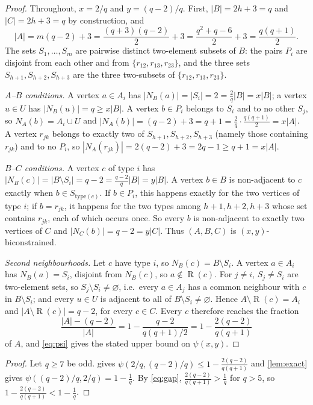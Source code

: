 \documentclass[11pt,a4paper]{article}
\theoremstyle{plain}
\theoremstyle{definition}
\theoremstyle{remark}
\newcommand{\NB}{N_B}
\newcommand{\NA}{N_A}
\newcommand{\NC}{N_C}
\DeclareMathOperator{\reach}{R}
\begin{document}
\label{pf:upper}
\propupper*
\begin{proof}
Throughout, $x=2/q$ and $y=(q-2)/q$. First, $|B|=2h+3=q$ and $|C|=2h+3=q$ by construction, and
\[
 |A|=m(q-2)+3=\frac{(q+3)(q-2)}2+3=\frac{q^2+q-6}2+3=\frac{q(q+1)}2 .
\]
The sets $S_1,\dots,S_m$ are pairwise distinct two-element subsets of $B$: the pairs $P_i$ are disjoint from each other and from $\{r_{12},r_{13},r_{23}\}$, and the three sets $S_{h+1},S_{h+2},S_{h+3}$ are the three two-subsets of $\{r_{12},r_{13},r_{23}\}$.

\emph{$A$--$B$ conditions.} A vertex $a\in A_i$ has $|\NB(a)|=|S_i|=2=\frac2q|B|=x|B|$; a vertex $u\in U$ has $|\NB(u)|=q\ge x|B|$. A vertex $b\in P_i$ belongs to $S_i$ and to no other $S_j$, so $\NA(b)=A_i\cup U$ and $|\NA(b)|=(q-2)+3=q+1=\frac2q\cdot\frac{q(q+1)}2=x|A|$. A vertex $r_{jk}$ belongs to exactly two of $S_{h+1},S_{h+2},S_{h+3}$ (namely those containing $r_{jk}$) and to no $P_i$, so $|\NA(r_{jk})|=2(q-2)+3=2q-1\ge q+1=x|A|$.

\emph{$B$--$C$ conditions.} A vertex $c$ of type $i$ has $|\NB(c)|=|B\setminus S_i|=q-2=\frac{q-2}q|B|=y|B|$. A vertex $b\in B$ is non-adjacent to $c$ exactly when $b\in S_{\text{type}(c)}$. If $b\in P_i$, this happens exactly for the two vertices of type $i$; if $b=r_{jk}$, it happens for the two types among $h+1,h+2,h+3$ whose set contains $r_{jk}$, each of which occurs once. So every $b$ is non-adjacent to exactly two vertices of $C$ and $|\NC(b)|=q-2=y|C|$. Thus $(A,B,C)$ is $(x,y)$-biconstrained.

\emph{Second neighbourhoods.} Let $c$ have type $i$, so $\NB(c)=B\setminus S_i$. A vertex $a\in A_i$ has $\NB(a)=S_i$, disjoint from $\NB(c)$, so $a\notin\reach(c)$. For $j\ne i$, $S_j\ne S_i$ are two-element sets, so $S_j\setminus S_i\ne\varnothing$, i.e.\ every $a\in A_j$ has a common neighbour with $c$ in $B\setminus S_i$; and every $u\in U$ is adjacent to all of $B\setminus S_i\ne\varnothing$. Hence $A\setminus\reach(c)=A_i$ and $|A\setminus\reach(c)|=q-2$, for every $c\in C$. Every $c$ therefore reaches the fraction
\[
 \frac{|A|-(q-2)}{|A|}=1-\frac{q-2}{q(q+1)/2}=1-\frac{2(q-2)}{q(q+1)}
\]
of $A$, and \eqref{eq:psi} gives the stated upper bound on $\psi(x,y)$.
\end{proof}

\label{pf:main}
\thmmain*
\begin{proof}
Let $q\ge7$ be odd.  gives $\psi(2/q,(q-2)/q)\le1-\frac{2(q-2)}{q(q+1)}$ and \cref{lem:exact} gives $\psi((q-2)/q,2/q)=1-\frac1q$. By \eqref{eq:gap}, $\frac{2(q-2)}{q(q+1)}>\frac1q$ for $q>5$, so $1-\frac{2(q-2)}{q(q+1)}<1-\frac1q$.
\end{proof}
\end{document}
